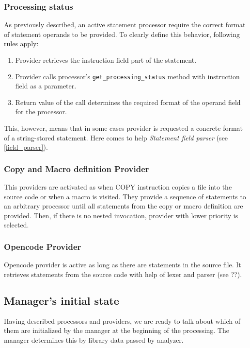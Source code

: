 \subsubsection{Processing status}
\label{proc_stat}

As previously described, an active statement processor require the correct format of statement operands to be provided. To clearly define this behavior, following rules apply:

\begin{enumerate}
	\item Provider retrieves the instruction field part of the statement.
	\item Provider calls processor's \texttt{get\_processing\_status} method with instruction field as a parameter.
	\item Return value of the call determines the required format of the operand field for the processor. 
\end{enumerate}

This, however, means that in some cases provider is requested a concrete format of a string-stored statement. Here comes to help \emph{Statement field parser} (see \cref{field_parser}). 


\subsubsection{Copy and Macro definition Provider}

This providers are activated as when COPY instruction copies a file into the source code or when a macro is visited. They provide a sequence of statements to an arbitrary processor until all statements from the copy or macro definition are provided. Then, if there is no nested invocation, provider with lower priority is selected.

\subsubsection{Opencode Provider}

Opencode provider is active as long as there are statements in the source file. It retrieves statements from the source code with help of lexer and parser (see ??).

\subsection{Manager's initial state}
Having described processors and providers, we are ready to talk about which of them are initialized by the manager at the beginning of the processing. The manager determines this by library data passed by analyzer.


